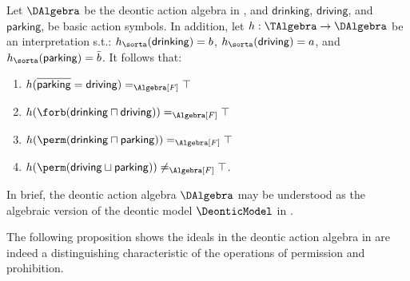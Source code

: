 \begin{example}
	Let $\DAlgebra$ be the deontic action algebra in , and $\mathsf{drinking}$, $\mathsf{driving}$, and $\mathsf{parking}$, be basic action symbols.
	In addition, let $h: \TAlgebra \to \DAlgebra$ be an interpretation s.t.:
		$h_{\sorta}(\mathsf{drinking}) = b$,
		$h_{\sorta}(\mathsf{driving}) = a$, and
		$h_{\sorta}(\mathsf{parking}) = \bar{b}$.
	It follows that:

   \begin{multicols}{2}
   \begin{enumerate}
      \item $h(\overline{\mathsf{parking}} = \mathsf{driving}) =_{\Algebra[F]} \top$
      \item $h(\forb(\mathsf{drinking} \sqcap \mathsf{driving})) =_{\Algebra[F]} \top$
      \item $h(\perm(\mathsf{drinking} \sqcap \mathsf{parking})) =_{\Algebra[F]} \top$
      \item $h(\perm(\mathsf{driving} \sqcup \mathsf{parking})) \neq_{\Algebra[F]} \top$.
   \end{enumerate}
   \end{multicols}

   \noindent In brief, the deontic action algebra $\DAlgebra$ may be understood as the algebraic version of the deontic model $\DeonticModel$ in .
\end{example}

The following proposition shows the ideals in the deontic action algebra in  are indeed a distinguishing characteristic of the operations of permission and prohibition.

